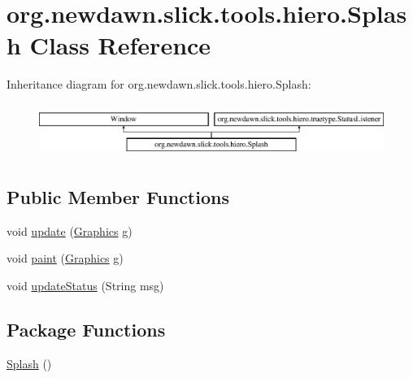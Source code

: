 \hypertarget{classorg_1_1newdawn_1_1slick_1_1tools_1_1hiero_1_1_splash}{}\section{org.\+newdawn.\+slick.\+tools.\+hiero.\+Splash Class Reference}
\label{classorg_1_1newdawn_1_1slick_1_1tools_1_1hiero_1_1_splash}
Inheritance diagram for org.\+newdawn.\+slick.\+tools.\+hiero.\+Splash\+:\begin{figure}[H]
\begin{center}
\leavevmode
\includegraphics[height=1.744548cm]{classorg_1_1newdawn_1_1slick_1_1tools_1_1hiero_1_1_splash}
\end{center}
\end{figure}
\subsection*{Public Member Functions}
\begin{DoxyCompactItemize}
\item 
void \mbox{\hyperlink{classorg_1_1newdawn_1_1slick_1_1tools_1_1hiero_1_1_splash_a69636eb36c7d982dd24bac9e3f30893e}{update}} (\mbox{\hyperlink{classorg_1_1newdawn_1_1slick_1_1_graphics}{Graphics}} g)
\item 
void \mbox{\hyperlink{classorg_1_1newdawn_1_1slick_1_1tools_1_1hiero_1_1_splash_accda1ecae214ca97c121caf5de258c0d}{paint}} (\mbox{\hyperlink{classorg_1_1newdawn_1_1slick_1_1_graphics}{Graphics}} g)
\item 
void \mbox{\hyperlink{classorg_1_1newdawn_1_1slick_1_1tools_1_1hiero_1_1_splash_a467907efe0d4c6dabd2b1f60ecefd660}{update\+Status}} (String msg)
\end{DoxyCompactItemize}
\subsection*{Package Functions}
\begin{DoxyCompactItemize}
\item 
\mbox{\hyperlink{classorg_1_1newdawn_1_1slick_1_1tools_1_1hiero_1_1_splash_abb0d061c651647e61beaacc7a84c69b4}{Splash}} ()
\end{DoxyCompactItemize}
